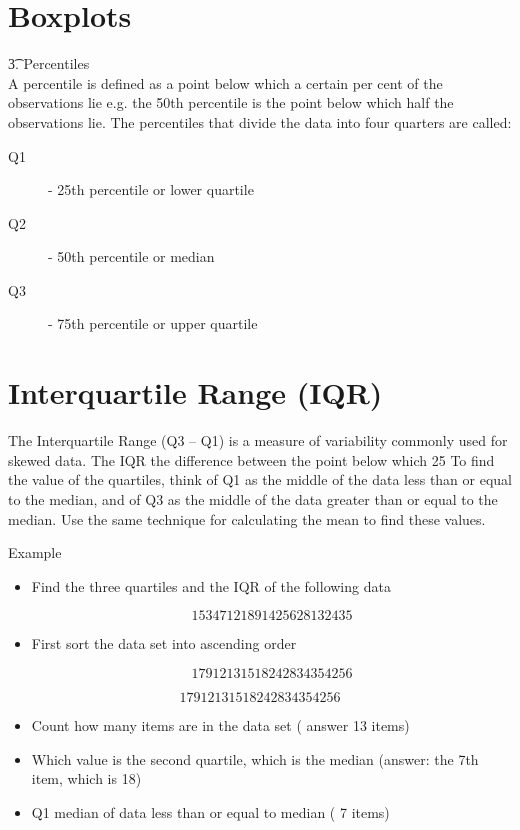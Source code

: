 \documentclass[]{report}
\begin{document}
\section{Boxplots}

\noindent \t{3.   Percentiles}\\

A percentile is defined as a point below which a certain per cent of the observations lie e.g. the 50th percentile is the point below which half the observations lie. The percentiles that divide the data into four quarters are called: 
\begin{description}
	\item[Q1]       - 25th percentile or lower quartile
	\item[Q2]       - 50th percentile or median
	\item[Q3]        - 75th percentile or upper quartile
\end{description}

\section{Interquartile Range (IQR)}
The Interquartile Range (Q3 – Q1) is a  measure of variability commonly used for skewed data.
The IQR  the difference between the point below which 25%
To find the value of the quartiles, think of Q1 as the middle of the data less than or equal to the median, and of Q3 as the middle of the data greater than or equal to the median.
Use the same technique for calculating the mean to find these values.



Example

\begin{itemize}
	\item Find the three quartiles and the IQR of the following data
	
	\[ 15  34  7  12  18  9  1  42  56  28  13  24  35  \]
	
	\item First sort the data set into ascending order
	
	\[1 7  9 12 13 15 18  24 28 34 35 42 56\]
\end{itemize}



\[1 7  9 12 13 15 18  24 28 34 35 42 56\]

\begin{itemize}
\item	Count how many items are in the data set ( answer 13 items)

\item 	Which value is the second quartile, which is the median (answer: the 7th item, which is 18)

\item 	Q1  median of data less than or equal to median ( 7 items)

\end{itemize}
\end{document}
